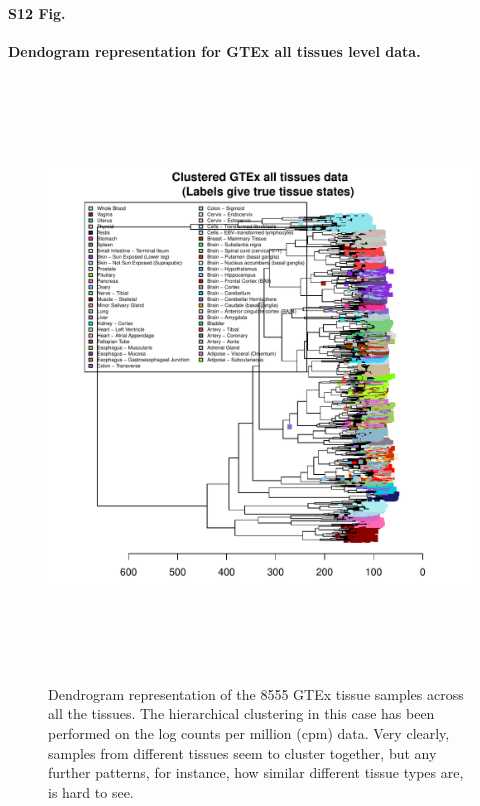 \documentclass[10pt,letterpaper]{article}
\begin{document}
\paragraph*{S12 Fig.}

\label{figS12}
{\bf Dendogram representation for GTEx all tissues level data.}
\begin{figure}[ht]
\centering
\includegraphics[height=6.3in, width=6in]{../../plots/dendextend_gtex.pdf}
\caption{Dendrogram representation of the 8555 GTEx tissue samples across all the tissues.
The hierarchical clustering in this case has been performed on the log counts per million (cpm) data.
Very clearly, samples from different tissues seem to cluster together, but any further patterns, for instance, how similar different tissue types are, is hard to see.}
\end{figure}
\end{document}
